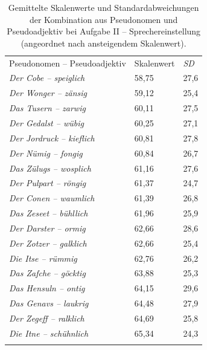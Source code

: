 \begin{table}
\begin{tabularx}{.8\textwidth}{lYY}
\lsptoprule
      \\
   \midrule
{Pseudonomen -- Pseudoadjektiv} & Skalenwert  &   \textit{SD} \\
\midrule
      \textit{Der Cobe -- speiglich} &  58,75   & 27,6  \\
                        \textit{Der Wonger -- zänsig} &  59,12    & 25,4  \\
      \textit{Das Tusern -- zarwig} &  60,11   & 27,5   \\
                        \textit{Der Gedalst -- wübig} &   60,25   & 27,1  \\
        \textit{Der Jordruck -- kieflich} &  60,81  & 27,8  \\
                        \textit{Der Nümig -- fongig} &  60,84    & 26,7  \\
      \textit{Das Zülugs -- wosplich} &  61,16  & 27,6    \\
                      \textit{Der Pulpart -- röngig} & 61,37    & 24,7  \\
         \textit{Der Conen -- waumlich} &  61,39    & 26,8  \\
                        \textit{Das Zeseet -- bühllich} &   61,96    & 25,9  \\
       \textit{Der Darster -- ormig} &  62,66   & 28,6  \\
                        \textit{Der Zotzer -- galklich} &  62,66    & 25,4  \\
       \textit{Die Itse -- rümmig} &  62,76  & 26,2  \\
                      \textit{Das Zafche -- göcktig} &  63,88    & 25,3  \\
       \textit{Das Hensuln -- ontig} &  64,15    & 29,6 \\
                        \textit{Das Genavs -- laukrig} &  64,48   & 27,9   \\
      \textit{Der Zegeff -- ralklich} &  64,69   & 25,8    \\
                        \textit{Die Itne -- schühnlich} &  65,34     & 24,3  \\
\lspbottomrule
\end{tabularx}
\caption[Gemittelte Skalenwerte der Pseudowörter bei {Aufgabe II} von Experiment 1]{Gemittelte Skalenwerte und Standardabweichungen der Kombination aus Pseudonomen und Pseudoadjektiv bei Aufgabe II -- Sprechereinstellung (angeordnet nach ansteigendem Skalenwert).}
\label{Pseudos2}
\end{table}

